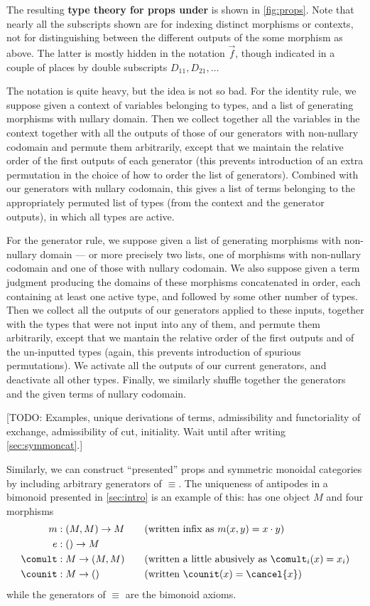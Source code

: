 The resulting \textbf{type theory for props under \cG} is shown in \cref{fig:props}.
Note that nearly all the subscripts shown are for indexing distinct morphisms or contexts, not for distinguishing between the different outputs of the some morphism as above.
The latter is mostly hidden in the notation $\vec f$, though indicated in a couple of places by double subscripts $D_{11}, D_{21},\dots$

The notation is quite heavy, but the idea is not so bad.
For the identity rule, we suppose given a context of variables belonging to types, and a list of generating morphisms with nullary domain.
Then we collect together all the variables in the context together with all the outputs of those of our generators with non-nullary codomain and permute them arbitrarily, except that we maintain the relative order of the first outputs of each generator (this prevents introduction of an extra permutation in the choice of how to order the list of generators).
Combined with our generators with nullary codomain, this gives a list of terms belonging to the appropriately permuted list of types (from the context and the generator outputs), in which all types are active.

For the generator rule, we suppose given a list of generating morphisms with non-nullary domain --- or more precisely two lists, one of morphisms with non-nullary codomain and one of those with nullary codomain.
We also suppose given a term judgment producing the domains of these morphisms concatenated in order, each containing at least one active type, and followed by some other number of types.
Then we collect all the outputs of our generators applied to these inputs, together with the types that were not input into any of them, and permute them arbitrarily, except that we mantain the relative order of the first outputs and of the un-inputted types (again, this prevents introduction of spurious permutations).
We activate all the outputs of our current generators, and deactivate all other types.
Finally, we similarly shuffle together the generators and the given terms of nullary codomain.

[TODO: Examples, unique derivations of terms, admissibility and functoriality of exchange, admissibility of cut, initiality.  Wait until after writing \cref{sec:symmoncat}.]


\newpage

Similarly, we can construct ``presented'' props and symmetric monoidal categories by including arbitrary generators of $\equiv$.
The uniqueness of antipodes in a bimonoid presented in \cref{sec:intro} is an example of this: \cG has one object $M$ and four morphisms
\begin{alignat*}{2}
m&:(M,M)\to M &&\quad\text{(written infix as $m(x,y) = x\cdot y$)}\\
e&:()\to M\\
\comult&:M\to (M,M) &&\quad\text{(written a little abusively as $\comult_i(x) = x_i$)}\\
\counit &:M\to () &&\quad\text{(written $\counit(x) = \cancel{x}$)}
\end{alignat*}
while the generators of $\equiv$ are the bimonoid axioms.

